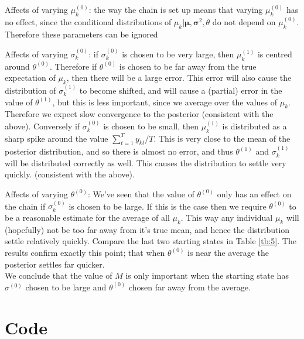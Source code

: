 \documentclass[10pt,a4paper,notitlepage]{article}
\begin{document}
Affects of varying $\mu_{k}^{(0)}$: the way the chain is set up means that varying $\mu_{k}^{(0)}$ has no effect, since the conditional distributions of $\mu_{k}|\bm{\mu},\bm{\sigma}^{2},\theta$ do not depend on $\mu^{(0)}_{k}$. Therefore these parameters can be ignored\par
Affects of varying $\sigma^{(0)}_{k}$: if $\sigma^{(0)}_{k}$ is chosen to be very large, then $\mu_{k}^{(1)}$ is centred around $\theta^{(0)}$. Therefore if $\theta^{(0)}$ is chosen to be far away from the true expectation of $\mu_{k}$, then there will be a large error. This error will also cause the distribution of $\sigma^{(1)}_{k}$ to become shifted, and will cause a (partial) error in the value of $\theta^{(1)}$, but this is less important, since we average over the values of $\mu_{k}$. Therefore we expect slow convergence to the posterior (consistent with the above). Conversely if $\sigma^{(0)}_{k}$ is chosen to be small, then $\mu^{(1)}_{k}$ is distributed as a sharp spike around the value $\sum_{t=1}^{T}y_{kt}/T$. This is very close to the mean of the posterior distribution, and so there is almost no error, and thus $\theta^{(1)}$ and $\sigma^{(1)}_{k}$ will be distributed correctly as well. This causes the distribution to settle very quickly. (consistent with the above). \par
Affects of varying $\theta^{(0)}$: We've seen that the value of $\theta^{(0)}$ only has an effect on the chain if $\sigma_{k}^{(0)}$ is chosen to be large. If this is the case then we require $\theta^{(0)}$ to be a reasonable estimate for the average of all $\mu_{k}$. This way any individual $\mu_{k}$ will (hopefully) not be too far away from it's true mean, and hence the distribution settle relatively quickly. Compare the last two starting states in Table \ref{tb:5}. The results confirm exactly this point; that when $\theta^{(0)}$ is near the average the posterior settles far quicker.\\

We conclude that the value of $M$ is only important when the starting state has $\sigma^{(0)}$ chosen to be large and $\theta^{(0)}$ chosen far away from the average. 

\pagebreak
\section*{\centering Code}
\end{document}
